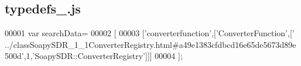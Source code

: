 \subsection{typedefs\+\_.\+js}
\label{typedefs__1_8js_source}

\begin{DoxyCode}
00001 var searchData=
00002 [
00003   [\textcolor{stringliteral}{'converterfunction'},[\textcolor{stringliteral}{'ConverterFunction'},[\textcolor{stringliteral}{'
      ../classSoapySDR\_1\_1ConverterRegistry.html#a49e1383cfdbcd16e65de5673d89e500d'},1,\textcolor{stringliteral}{'SoapySDR::ConverterRegistry'}]]]
00004 ];
\end{DoxyCode}
